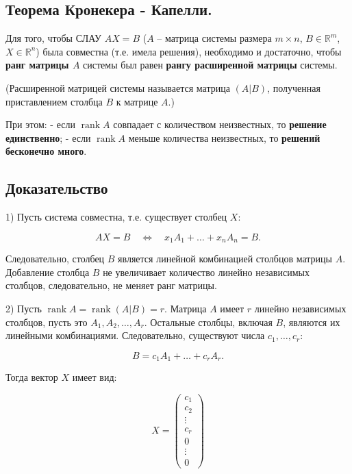 {
\subsection{Теорема Кронекера - Капелли.}

Для того, чтобы СЛАУ \( AX = B \) (\( A \) – матрица системы размера \( m \times n \), \( B \in \mathbb{R}^m \), \( X \in \mathbb{R}^n \)) была совместна (т.е. имела решения), необходимо и достаточно, чтобы \textbf{ранг матрицы \( A \)} системы был равен \textbf{рангу расширенной матрицы} системы.

(Расширенной матрицей системы называется матрица \( (A|B) \), полученная приставлением столбца \( B \) к матрице \( A \).)

При этом:
- если \( \operatorname{rank} A \) совпадает с количеством неизвестных, то \textbf{решение единственно};
- если \( \operatorname{rank} A \) меньше количества неизвестных, то \textbf{решений бесконечно много}.




\subsection*{Доказательство}

1) Пусть система совместна, т.е. существует столбец \( X \):



\[
AX = B \quad \Leftrightarrow \quad x_1 A_1 + \dots + x_n A_n = B.
\]



Следовательно, столбец \( B \) является линейной комбинацией столбцов матрицы \( A \). Добавление столбца \( B \) не увеличивает количество линейно независимых столбцов, следовательно, не меняет ранг матрицы.

2) Пусть \( \operatorname{rank} A = \operatorname{rank} (A|B) = r \). Матрица \( A \) имеет \( r \) линейно независимых столбцов, пусть это \( A_1, A_2, \dots, A_r \). Остальные столбцы, включая \( B \), являются их линейными комбинациями. Следовательно, существуют числа \( c_1, \dots, c_r \):



\[
B = c_1 A_1 + \dots + c_r A_r.
\]



Тогда вектор \( X \) имеет вид:



\[
X =
\begin{pmatrix}
c_1 \\
c_2 \\
\vdots \\
c_r \\
0 \\
\vdots \\
0
\end{pmatrix}
\]



}
